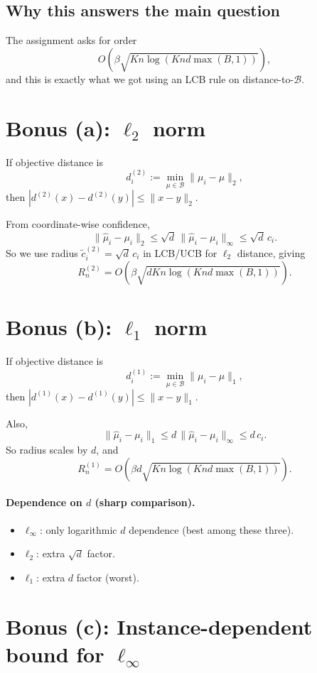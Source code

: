 \documentclass[11pt]{article}
\begin{document}
\subsection*{Why this answers the main question}

The assignment asks for order
\[
O\!\left(\beta\sqrt{Kn\log(Knd\max(B,1))}\right),
\]
and this is exactly what we got using an LCB rule on distance-to-$\mathcal{B}$.

\newpage
\section*{Bonus (a): $\ell_2$ norm}

If objective distance is
\[
d_i^{(2)} := \min_{\mu\in\mathcal{B}}\|\mu_i-\mu\|_2,
\]
then $|d^{(2)}(x)-d^{(2)}(y)|\le \|x-y\|_2$.

From coordinate-wise confidence,
\[
\|\hat{\mu}_i-\mu_i\|_2 \le \sqrt{d}\,\|\hat{\mu}_i-\mu_i\|_\infty
\le \sqrt{d}\,c_i.
\]
So we use radius $\tilde c_i^{(2)}=\sqrt d\,c_i$ in LCB/UCB for $\ell_2$ distance, giving
\[
R_n^{(2)}
=
O\!\left(\beta\sqrt{dKn\log(Knd\max(B,1))}\right).
\]

\section*{Bonus (b): $\ell_1$ norm}

If objective distance is
\[
d_i^{(1)} := \min_{\mu\in\mathcal{B}}\|\mu_i-\mu\|_1,
\]
then $|d^{(1)}(x)-d^{(1)}(y)|\le \|x-y\|_1$.

Also,
\[
\|\hat{\mu}_i-\mu_i\|_1
\le d\,\|\hat{\mu}_i-\mu_i\|_\infty
\le d\,c_i.
\]
So radius scales by $d$, and
\[
R_n^{(1)}
=
O\!\left(\beta d\sqrt{Kn\log(Knd\max(B,1))}\right).
\]

\paragraph{Dependence on $d$ (sharp comparison).}
\begin{itemize}[leftmargin=1.5em]
\item $\ell_\infty$: only logarithmic $d$ dependence (best among these three).
\item $\ell_2$: extra $\sqrt d$ factor.
\item $\ell_1$: extra $d$ factor (worst).
\end{itemize}

\section*{Bonus (c): Instance-dependent bound for $\ell_\infty$}
\end{document}
